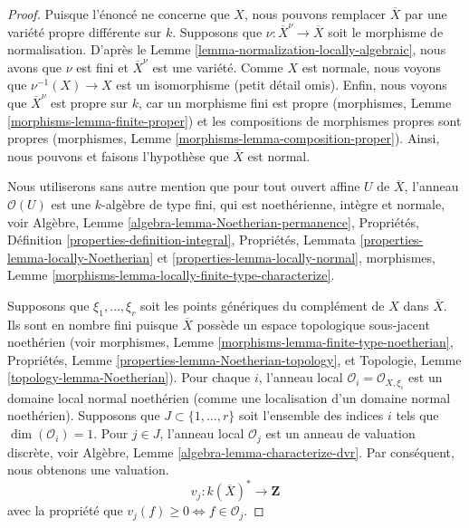\begin{proof}
Puisque l'énoncé ne concerne que $X$, nous pouvons remplacer
$\overline{X}$ par une variété propre différente sur $k$.
Supposons que $\nu : \overline{X}^\nu \to \overline{X}$ soit le
morphisme de normalisation. D'après le Lemme
\ref{lemma-normalization-locally-algebraic}, nous avons que $\nu$ est
fini et $\overline{X}^\nu$ est une variété. Comme $X$ est normale,
nous voyons que $\nu^{-1}(X) \to X$ est un isomorphisme (petit détail
omis). Enfin, nous voyons que $\overline{X}^\nu$ est propre sur $k$,
car un morphisme fini est propre (morphismes, Lemme
\ref{morphisms-lemma-finite-proper}) et les compositions de morphismes
propres sont propres (morphismes, Lemme
\ref{morphisms-lemma-composition-proper}). Ainsi, nous pouvons et faisons l'hypothèse que $\overline{X}$ est normal.

\medskip\noindent
Nous utiliserons sans autre mention que pour tout ouvert
affine $U$ de $\overline{X}$, l'anneau $\mathcal{O}(U)$ est
une $k$-algèbre de type fini, qui est noethérienne, intègre et
normale, voir Algèbre, Lemme
\ref{algebra-lemma-Noetherian-permanence}, Propriétés, Définition
\ref{properties-definition-integral}, Propriétés, Lemmata
\ref{properties-lemma-locally-Noetherian} et
\ref{properties-lemma-locally-normal}, morphismes, Lemme \ref{morphisms-lemma-locally-finite-type-characterize}.

\medskip\noindent
Supposons que $\xi_1, \ldots, \xi_r$ soit les points génériques du
complément de $X$ dans $\overline{X}$. Ils sont en nombre fini
puisque $\overline{X}$ possède un espace topologique sous-jacent
noethérien (voir morphismes, Lemme
\ref{morphisms-lemma-finite-type-noetherian}, Propriétés, Lemme
\ref{properties-lemma-Noetherian-topology}, et Topologie, Lemme
\ref{topology-lemma-Noetherian}). Pour chaque $i$, l’anneau local
$\mathcal{O}_i = \mathcal{O}_{X, \xi_i}$ est un domaine local normal
noethérien (comme une localisation d’un domaine normal noethérien).
Supposons que $J \subset \{1, \ldots, r\}$ soit l’ensemble des indices $i$
tels que $\dim(\mathcal{O}_i) = 1$. Pour $j \in J$, l’anneau local
$\mathcal{O}_j$ est un anneau de valuation discrète, voir Algèbre, Lemme
\ref{algebra-lemma-characterize-dvr}. Par conséquent, nous obtenons une valuation.
$$
v_j : k(\overline{X})^* \longrightarrow \mathbf{Z}
$$
avec la propriété que $v_j(f) \geq 0 \Leftrightarrow f \in \mathcal{O}_j$.


\end{proof}

